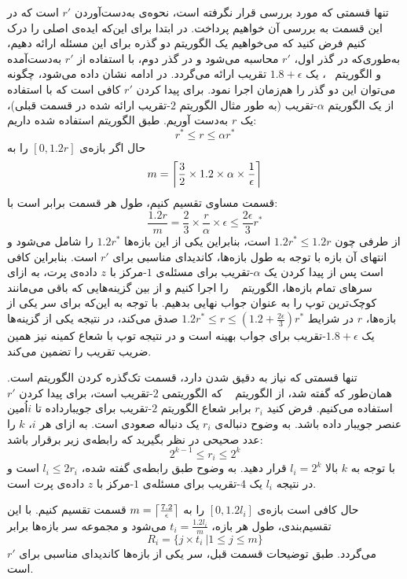 تنها قسمتی که مورد بررسی قرار نگرفته است، نحوه‌ی به‌دست‌آوردن $r'$ است که در این قسمت به بررسی آن خواهیم پرداخت. در ابتدا برای این‌که ایده‌ی اصلی را درک کنیم فرض کنید که می‌خواهیم یک الگوریتم دو گذره برای این مسئله ارائه دهیم، به‌طوری‌که در گذر اول، $r'$ محاسبه می‌شود و در گذر دوم، با استفاده از‌ $r'$ به‌دست‌آمده و الگوریتم ~، یک $1.8 + \epsilon$ تقریب ارائه می‌گردد. در ادامه نشان داده می‌شود، چگونه می‌توان این دو گذر را هم‌زمان اجرا نمود. برای پیدا کردن $r'$ کافی است که با استفاده از یک الگوریتم $\alpha$-تقریب (به طور مثال الگوریتم $2$-تقریب ارائه شده در قسمت قبلی)، یک $r$ به‌دست آوریم. طبق الگوریتم استفاده شده داریم:
$$r^* \leq r \leq \alpha r^*$$ 
حال اگر بازه‌ی $[0, 1.2r]$ را به 
$$m = \left\lceil{\frac{3}{2} \times 1.2 \times \alpha \times \frac{1}{\epsilon}}\right\rceil$$
 قسمت مساوی تقسیم کنیم، طول هر قسمت برابر است با:
 $$\frac{1.2  r}{m} = \frac{2}{3} \times \frac{r}{\alpha} \times \epsilon \leq \frac{2\epsilon}{3}r^*$$
 از طرفی چون $1.2r^* \leq 1.2r$ است، بنابراین یکی از این بازه‌ها $1.2r^*$ را شامل می‌شود و انتهای آن بازه با توجه به طول بازه‌ها، کاندیدای مناسبی برای $r'$ است. بنابراین کافی است پس از پیدا کردن یک $\alpha$-تقریب برای مسئله‌ی $1$-مرکز‌ با $z$ داده‌ی پرت، به ازای سرهای تمام بازه‌ها، الگوریتم ~ را اجرا کنیم و از بین گزینه‌هایی که باقی می‌مانند کوچک‌ترین توپ را به عنوان جواب نهایی بدهیم. با توجه به این‌که برای سر یکی از بازه‌ها، $r$ در شرایط  $1.2r^* \leq r \leq (1.2 + \frac{2\epsilon}{3})r^*$  صدق می‌کند، در نتیجه یکی از گزینه‌ها یک $1.8 + \epsilon$-تقریب برای جواب بهینه است و در نتیجه توپ با شعاع کمینه نیز‌ همین ضریب تقریب را تضمین می‌کند.
 
 تنها قسمتی که نیاز به دقیق شدن دارد، قسمت تک‌گذره کردن الگوریتم است. همان‌طور که گفته شد، از الگوریتم ~ که الگوریتمی $2$-تقریب است، برای پیدا کردن $r'$ استفاده می‌کنیم. فرض کنید $r_i$ برابر شعاع الگوریتم $2$-تقریب برای جویبارداده تا $i$اُمین عنصر جویبار داده باشد. به وضوح دنباله‌ی $r_i$ یک دنباله صعودی است. به ازای هر $i$، $k$ را عدد صحیحی در نظر بگیرید که رابطه‌‌ی زیر برقرار باشد:
 $$2^{k-1} \leq r_i \leq 2^k$$
 با توجه به $k$ بالا $l_i = 2^k$ قرار دهید. به وضوح طبق‌ رابطه‌ی گفته شده، $l_i \leq 2r_i$ است و در نتیجه $l_i$ یک $4$-تقریب برای مسئله‌ی $1$-مرکز  با $z$ داده‌ی پرت است.
 
 حال کافی است بازه‌ی $[0, 1.2l_i]$ را به $m = \left\lceil{\frac{7.2}{\epsilon}}\right\rceil$ قسمت تقسیم کنیم. با این تقسیم‌بندی، طول هر بازه، $t_i = \frac{1.2l_i}{m}$ می‌شود و مجموعه سر بازه‌ها برابر
 $$R_i = \{ j \times t_i \ | 1 \leq j \leq m \}$$
 می‌گردد. طبق توضیحات قسمت قبل، سر یکی از بازه‌ها کاندیدای مناسبی برای $r'$ است. 
 
